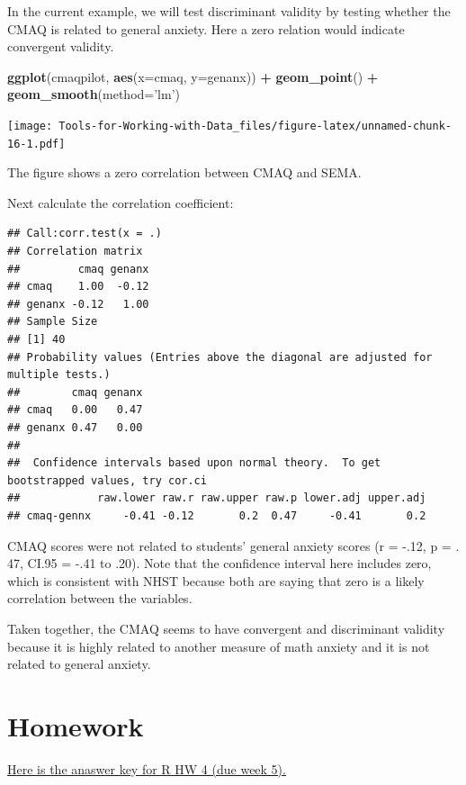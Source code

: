 \documentclass[
]{book}
\newenvironment{Shaded}{\begin{snugshade}}{\end{snugshade}}
\newcommand{\DataTypeTok}[1]{\textcolor[rgb]{0.13,0.29,0.53}{#1}}
\newcommand{\KeywordTok}[1]{\textcolor[rgb]{0.13,0.29,0.53}{\textbf{#1}}}
\newcommand{\NormalTok}[1]{#1}
\newcommand{\OperatorTok}[1]{\textcolor[rgb]{0.81,0.36,0.00}{\textbf{#1}}}
\newcommand{\OtherTok}[1]{\textcolor[rgb]{0.56,0.35,0.01}{#1}}
\newcommand{\StringTok}[1]{\textcolor[rgb]{0.31,0.60,0.02}{#1}}
\begin{document}
In the current example, we will test discriminant validity by testing whether the CMAQ is related to general anxiety. Here a zero relation would indicate convergent validity.

\begin{Shaded}
\begin{Highlighting}[]
\KeywordTok{ggplot}\NormalTok{(cmaqpilot, }\KeywordTok{aes}\NormalTok{(}\DataTypeTok{x=}\NormalTok{cmaq, }\DataTypeTok{y=}\NormalTok{genanx)) }\OperatorTok{+}
\StringTok{  }\KeywordTok{geom_point}\NormalTok{() }\OperatorTok{+}
\StringTok{  }\KeywordTok{geom_smooth}\NormalTok{(}\DataTypeTok{method=}\StringTok{'lm'}\NormalTok{)}
\end{Highlighting}
\end{Shaded}

\texttt{[image: Tools-for-Working-with-Data\_files/figure-latex/unnamed-chunk-16-1.pdf]}

The figure shows a zero correlation between CMAQ and SEMA.

Next calculate the correlation coefficient:

\begin{Shaded}
\end{Shaded}

\begin{verbatim}
## Call:corr.test(x = .)
## Correlation matrix 
##         cmaq genanx
## cmaq    1.00  -0.12
## genanx -0.12   1.00
## Sample Size 
## [1] 40
## Probability values (Entries above the diagonal are adjusted for multiple tests.) 
##        cmaq genanx
## cmaq   0.00   0.47
## genanx 0.47   0.00
## 
##  Confidence intervals based upon normal theory.  To get bootstrapped values, try cor.ci
##            raw.lower raw.r raw.upper raw.p lower.adj upper.adj
## cmaq-gennx     -0.41 -0.12       0.2  0.47     -0.41       0.2
\end{verbatim}

CMAQ scores were not related to students' general anxiety scores (r = -.12, p = . 47, CI.95 = -.41 to .20). Note that the confidence interval here includes zero, which is consistent with NHST because both are saying that zero is a likely correlation between the variables.

Taken together, the CMAQ seems to have convergent and discriminant validity because it is highly related to another measure of math anxiety and it is not related to general anxiety.

\hypertarget{homework}{%
\section{Homework}\label{homework}}

\href{./measurementhw.R}{Here is the anaswer key for R HW 4 (due week 5).}

  
\end{document}

